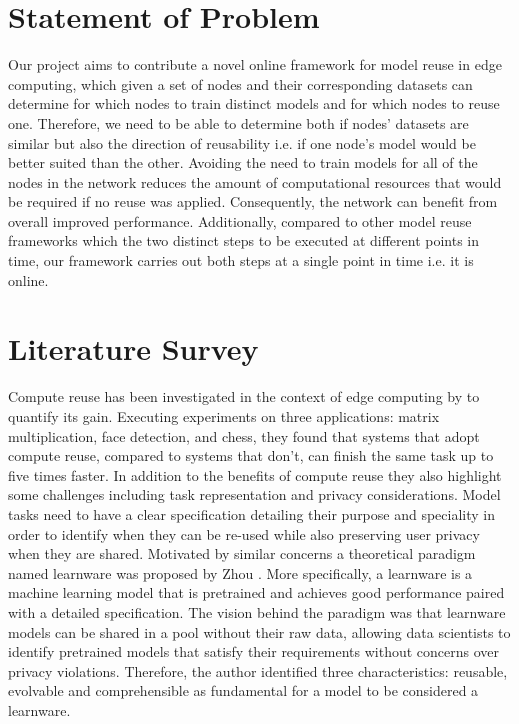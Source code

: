 \documentclass{mprop}
\begin{document}
\section{Statement of Problem}

Our project aims to contribute a novel online framework for model reuse in edge computing, which given a set of nodes and their corresponding datasets can determine for which nodes to train distinct models and for which nodes to reuse one. Therefore, we need to be able to determine both if nodes' datasets are similar but also the direction of reusability i.e. if one node's model would be better suited than the other. Avoiding the need to train models for all of the nodes in the network reduces the amount of computational resources that would be required if no reuse was applied. Consequently, the network can benefit from overall improved performance. Additionally, compared to other model reuse frameworks which the two distinct steps to be executed at different points in time, our framework carries out both steps at a single point in time i.e. it is online. 
 
\section{Literature Survey}

Compute reuse has been investigated in the context of edge computing by \cite{ComputeReuse} to quantify its gain. Executing experiments on three applications: matrix multiplication, face detection, and chess, they found that systems that adopt compute reuse, compared to systems that don't, can finish the same task up to five times faster. In addition to the benefits of compute reuse they also highlight some challenges including task representation and privacy considerations. Model tasks need to have a clear specification detailing their purpose and speciality in order to identify when they can be re-used while also preserving user privacy when they are shared. Motivated by similar concerns a theoretical paradigm named learnware was proposed by Zhou \cite{Learnware}. More specifically, a learnware is a machine learning model that is pretrained and achieves good performance paired with a detailed specification. The vision behind the paradigm was that learnware models can be shared in a pool without their raw data, allowing data scientists to identify pretrained models that satisfy their requirements without concerns over privacy violations. Therefore, the author identified three characteristics: reusable, evolvable and comprehensible as fundamental for a model to be considered a learnware.  
\end{document}
